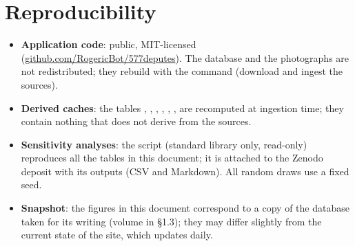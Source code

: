 \section{Reproducibility}\label{sec:repro-en}
\begin{itemize}
  \item \textbf{Application code}: public, MIT-licensed
        (\href{https://github.com/RogericBot/577deputes}{github.com/RogericBot/577deputes}).
        The database and the photographs are not redistributed; they rebuild with
        the command  (download and ingest the sources).
  \item \textbf{Derived caches}: the tables ,
        , ,
        , , ,
         are recomputed at ingestion time; they contain nothing
        that does not derive from the sources.
  \item \textbf{Sensitivity analyses}: the script 
        (standard library only, read-only) reproduces all the tables in this
        document; it is attached to the Zenodo deposit with its outputs (CSV and
        Markdown). All random draws use a fixed seed.
  \item \textbf{Snapshot}: the figures in this document correspond to a copy of the
        database taken for its writing (volume in §1.3); they may differ slightly
        from the current state of the site, which updates daily.
\end{itemize}

